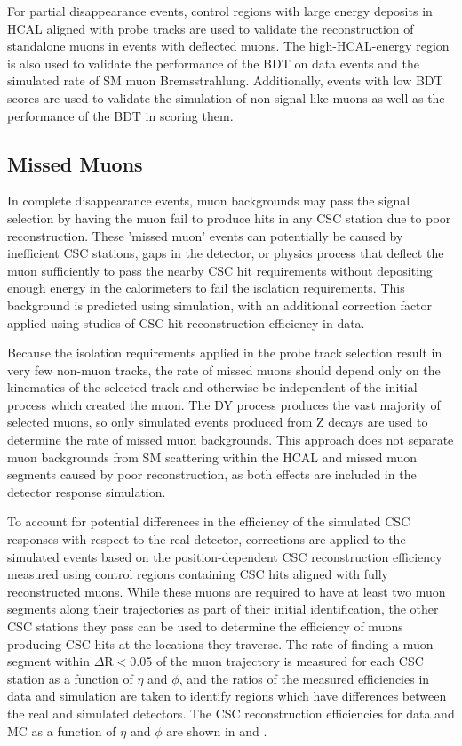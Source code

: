 For partial disappearance events, control regions with large energy deposits in HCAL aligned with probe tracks are used to validate the reconstruction of standalone muons in events with deflected muons.
The high-HCAL-energy region is also used to validate the performance of the BDT on data events and the simulated rate of SM muon Bremsstrahlung.
Additionally, events with low BDT scores are used to validate the simulation of non-signal-like muons as well as the performance of the BDT in scoring them.

\subsection{Missed Muons}
\label{sec:missedMuons}
In complete disappearance events, muon backgrounds may pass the signal selection by having the muon fail to produce hits in any CSC station due to poor reconstruction. 
These 'missed muon' events can potentially be caused by inefficient CSC stations, gaps in the detector, or physics process that deflect the muon sufficiently to pass the nearby CSC hit requirements without depositing enough energy in the calorimeters to fail the isolation requirements. 
This background is predicted using simulation, with an additional correction factor applied using studies of CSC hit reconstruction efficiency in data. 

Because the isolation requirements applied in the probe track selection result in very few non-muon tracks, the rate of missed muons should depend only on the kinematics of the selected track and otherwise be independent of the initial process which created the muon. 
The DY process produces the vast majority of selected muons, so only simulated events produced from Z decays are used to determine the rate of missed muon backgrounds.
This approach does not separate muon backgrounds from SM scattering within the HCAL and missed muon segments caused by poor reconstruction, as both effects are included in the detector response simulation.

To account for potential differences in the efficiency of the simulated CSC responses with respect to the real detector, corrections are applied to the simulated events based on the position-dependent CSC reconstruction efficiency measured using control regions containing CSC hits aligned with fully reconstructed muons.
While these muons are required to have at least two muon segments along their trajectories as part of their initial identification, the other CSC stations they pass can be used to determine the efficiency of muons producing CSC hits at the locations they traverse.
The rate of finding a muon segment within $\Delta$R$<$0.05 of the muon trajectory is measured for each CSC station as a function of $\eta$ and $\phi$, and the ratios of the measured efficiencies in data and simulation are taken to identify regions which have differences between the real and simulated detectors.
The CSC reconstruction efficiencies for data and MC as a function of $\eta$ and $\phi$ are shown in  and .

